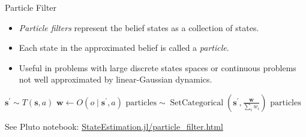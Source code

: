\begin{frame}[fragile]{Particle Filter}


\begin{itemize}
    \item \textit{Particle filters} represent the belief states as a collection of states.
    \item Each state in the approximated belief is called a \textit{particle}.
    \item Useful in problems with large discrete states spaces or continuous problems not well approximated by linear-Gaussian dynamics.
\end{itemize}

\pause
\setcounter{algorithm}{0}
\begin{algorithm}[H]
    \caption{Particle filter algorithm.}
    \label{alg:particle_filter}
    \begin{algorithmic}
    \pause \State $\mathbf{s}^\prime \sim T(\mathbf{s}, a)$ 
    \pause \State $\mathbf{w} \leftarrow O(o \mid \mathbf{s}^\prime, a)$ 
    \pause \State $\text{particles} \sim \operatorname{SetCategorical}\left(\mathbf{s}^\prime, \frac{\mathbf{w}}{\sum_i w_i}\right)$ 
    \pause \State \Return $\text{particles}$
    \EndFunction
    \end{algorithmic}
\end{algorithm}

\pause See Pluto notebook: \href{http://htmlview.glitch.me/?https://raw.githubusercontent.com/mossr/StateEstimation.jl/master/html/particle_filter.html}{\color{cardinal}StateEstimation.jl/particle\_filter.html}

\end{frame}
